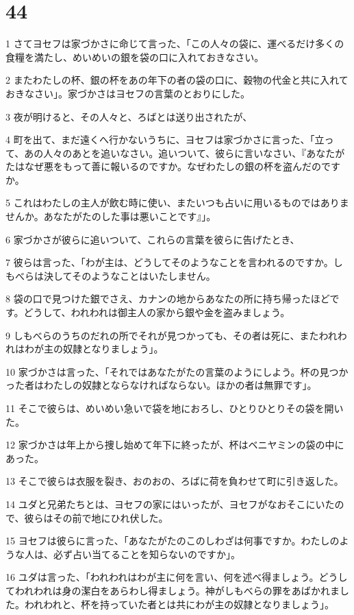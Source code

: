 \chapter{44}

\par 1 さてヨセフは家づかさに命じて言った、「この人々の袋に、運べるだけ多くの食糧を満たし、めいめいの銀を袋の口に入れておきなさい。
\par 2 またわたしの杯、銀の杯をあの年下の者の袋の口に、穀物の代金と共に入れておきなさい」。家づかさはヨセフの言葉のとおりにした。
\par 3 夜が明けると、その人々と、ろばとは送り出されたが、
\par 4 町を出て、まだ遠くへ行かないうちに、ヨセフは家づかさに言った、「立って、あの人々のあとを追いなさい。追いついて、彼らに言いなさい、『あなたがたはなぜ悪をもって善に報いるのですか。なぜわたしの銀の杯を盗んだのですか。
\par 5 これはわたしの主人が飲む時に使い、またいつも占いに用いるものではありませんか。あなたがたのした事は悪いことです』」。
\par 6 家づかさが彼らに追いついて、これらの言葉を彼らに告げたとき、
\par 7 彼らは言った、「わが主は、どうしてそのようなことを言われるのですか。しもべらは決してそのようなことはいたしません。
\par 8 袋の口で見つけた銀でさえ、カナンの地からあなたの所に持ち帰ったほどです。どうして、われわれは御主人の家から銀や金を盗みましょう。
\par 9 しもべらのうちのだれの所でそれが見つかっても、その者は死に、またわれわれはわが主の奴隷となりましょう」。
\par 10 家づかさは言った、「それではあなたがたの言葉のようにしよう。杯の見つかった者はわたしの奴隷とならなければならない。ほかの者は無罪です」。
\par 11 そこで彼らは、めいめい急いで袋を地におろし、ひとりひとりその袋を開いた。
\par 12 家づかさは年上から捜し始めて年下に終ったが、杯はベニヤミンの袋の中にあった。
\par 13 そこで彼らは衣服を裂き、おのおの、ろばに荷を負わせて町に引き返した。
\par 14 ユダと兄弟たちとは、ヨセフの家にはいったが、ヨセフがなおそこにいたので、彼らはその前で地にひれ伏した。
\par 15 ヨセフは彼らに言った、「あなたがたのこのしわざは何事ですか。わたしのような人は、必ず占い当てることを知らないのですか」。
\par 16 ユダは言った、「われわれはわが主に何を言い、何を述べ得ましょう。どうしてわれわれは身の潔白をあらわし得ましょう。神がしもべらの罪をあばかれました。われわれと、杯を持っていた者とは共にわが主の奴隷となりましょう」。
